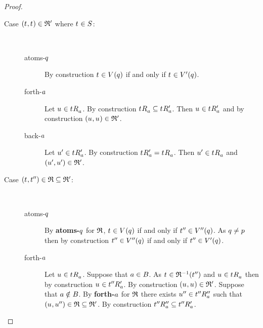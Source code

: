 \begin{proof}
\begin{description}
    \item[Case $(\kStateT, \kStateT) \in \bisimulation'$ where $\kStateT \in \kStates$:]
        \hfill\\
        \begin{description}
            \item[atoms-$q$] 
                By construction $\kStateT \in \kValuation(\atomQ)$ if and only if $\kStateT \in \kValuationP(\atomQ)$.
            \item[forth-$a$]
                Let $\kStateU \in \kSuccessorsA{\kStateT}$.
                By construction $\kSuccessorsA{\kStateT} \subseteq \kSuccessorsPA{\kStateT}$.
                Then $\kStateU \in \kSuccessorsPA{\kStateT}$ and by construction $(\kStateU, \kStateU) \in \bisimulation'$.
            \item[back-$a$]
                Let $\kStateUP \in \kSuccessorsPA{\kStateT}$.
                By construction $\kSuccessorsPA{\kStateT} = \kSuccessorsA{\kStateT}$.
                Then $\kStateUP \in \kSuccessorsA{\kStateT}$ and $({u}^{\prime}, {u}^{\prime}) \in \mathfrak{R}'$.
        \end{description}
    \item[Case $(\kStateT, \kStateTPP) \in \refinement \subseteq \bisimulation'$:]
        \hfill\\
        \begin{description}
            \item[atoms-$q$] 
                By {\bf atoms-$q$} for $\mathfrak{R}$, $\kStateT \in \kValuation(\atomQ)$ if and only if ${t}^{\prime\prime} \in {V^{\prime\prime}}(q)$.
                As $q \neq p$ then by construction ${t}^{\prime\prime} \in {V^{\prime\prime}}(q)$ if and only if ${t}^{\prime\prime} \in {V^{\prime}}(q)$.
            \item[forth-$a$]
                Let $\kStateU \in \kSuccessorsA{\kStateT}$.
                Suppose that $a \in B$.
                As $\kStateT \in \refinement^{-1}(\kStateTPP)$ and $\kStateU \in \kSuccessorsA{\kStateT}$ then by construction $\kStateU \in \kSuccessorsPA{\kStateTPP}$.
                By construction $(\kStateU, \kStateU) \in \bisimulation'$.
                Suppose that $a \notin B$.
                By {\bf forth-$a$} for $\mathfrak{R}$ there exists ${u}^{\prime\prime} \in {{t}^{\prime\prime}} {R^{\prime\prime}_{a}}$ such that $(\kStateU, \kStateUPP) \in \refinement \subseteq \bisimulation'$.
                By construction ${{t}^{\prime\prime}} {R^{\prime\prime}_{a}} \subseteq {{t}^{\prime\prime}} {R^{\prime}_{a}}$.

\end{description}
\end{description}
\end{proof}
